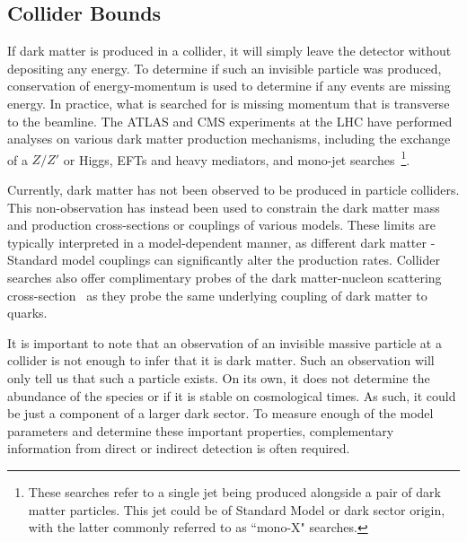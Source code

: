 \subsection{Collider Bounds}

If dark matter is produced in a collider, it will simply leave the detector without depositing any energy. To determine if such an invisible particle was produced, conservation of energy-momentum is used to determine if any events are missing energy. In practice, what is searched for is missing momentum that is transverse to the beamline.
The ATLAS and CMS experiments at the LHC have performed analyses on various dark matter production mechanisms, including the exchange of a $Z/Z'$ or Higgs, EFTs and heavy mediators, and mono-jet searches~\cite{CMS:2017jdm_jul_Searchdarkmatter}\footnote{These searches refer to a single jet being produced alongside a pair of dark matter particles. This jet could be of Standard Model or dark sector origin, with the latter commonly referred to as ``mono-X" searches.}. 

Currently, dark matter has not been observed to be produced in particle colliders. This non-observation has instead been used to constrain the dark matter mass and production cross-sections or couplings of various models. 
These limits are typically interpreted in a model-dependent manner, as different dark matter - Standard model couplings can significantly alter the production rates. Collider searches also offer complimentary probes of the dark matter-nucleon scattering cross-section~\cite{Ruppin:2014bra_oct_Complementaritydarkmatter} as they probe the same underlying coupling of dark matter to quarks.  

 
 It is important to note that an observation of an invisible massive particle at a collider is not enough to infer that it is dark matter. Such an observation will only tell us that such a particle exists. On its own, it does not determine the abundance of the species or if it is stable on cosmological times. As such, it could be just a component of a larger dark sector. To measure enough of the model parameters and determine these important properties, complementary information from direct or indirect detection is often required. 
 
